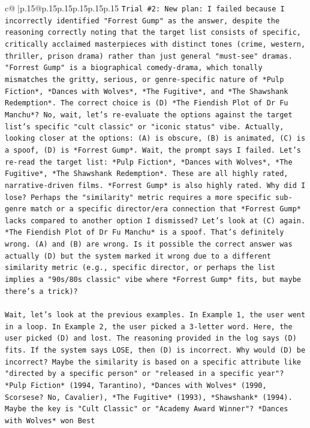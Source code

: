 \documentclass{article}
\begin{document}
{\begin{supertabular}{c@{$\;$}|p{.15\linewidth}@{}p{.15\linewidth}p{.15\linewidth}p{.15\linewidth}p{.15\linewidth}p{.15\linewidth}}
{{{\texttt{Trial \#2: New plan: I failed because I incorrectly identified "Forrest Gump" as the answer, despite the reasoning correctly noting that the target list consists of specific, critically acclaimed masterpieces with distinct tones (crime, western, thriller, prison drama) rather than just general "must{-}see" dramas. "Forrest Gump" is a biographical comedy{-}drama, which tonally mismatches the gritty, serious, or genre{-}specific nature of *Pulp Fiction*, *Dances with Wolves*, *The Fugitive*, and *The Shawshank Redemption*. The correct choice is (D) *The Fiendish Plot of Dr Fu Manchu*? No, wait, let's re{-}evaluate the options against the target list's specific "cult classic" or "iconic status" vibe. Actually, looking closer at the options: (A) is obscure, (B) is animated, (C) is a spoof, (D) is *Forrest Gump*. Wait, the prompt says I failed. Let's re{-}read the target list: *Pulp Fiction*, *Dances with Wolves*, *The Fugitive*, *The Shawshank Redemption*. These are all highly rated, narrative{-}driven films. *Forrest Gump* is also highly rated. Why did I lose? Perhaps the "similarity" metric requires a more specific sub{-}genre match or a specific director/era connection that *Forrest Gump* lacks compared to another option I dismissed? Let's look at (C) again. *The Fiendish Plot of Dr Fu Manchu* is a spoof. That's definitely wrong. (A) and (B) are wrong. Is it possible the correct answer was actually (D) but the system marked it wrong due to a different similarity metric (e.g., specific director, or perhaps the list implies a "90s/80s classic" vibe where *Forrest Gump* fits, but maybe there's a trick)? } \\
\\ 
\texttt{Wait, let's look at the previous examples. In Example 1, the user went in a loop. In Example 2, the user picked a 3{-}letter word. Here, the user picked (D) and lost. The reasoning provided in the log says (D) fits. If the system says LOSE, then (D) is incorrect. Why would (D) be incorrect? Maybe the similarity is based on a specific attribute like "directed by a specific person" or "released in a specific year"? } \\
\texttt{*Pulp Fiction* (1994, Tarantino), *Dances with Wolves* (1990, Scorsese? No, Cavalier), *The Fugitive* (1993), *Shawshank* (1994). } \\
\texttt{Maybe the key is "Cult Classic" or "Academy Award Winner"? *Dances with Wolves* won Best} \\
\\ 
}}}
\end{supertabular}}
\end{document}
